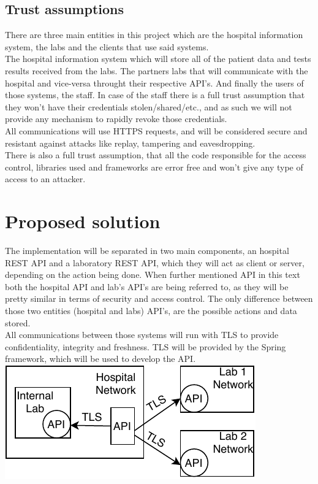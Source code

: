 \subsection{Trust assumptions}


There are three main entities in this project which are the hospital information system, the labs and the clients that use said systems. \\

The hospital information system which will store all of the patient data and tests results received from the labs. The partners labs that will communicate with the hospital and vice-versa throught their respective API's. And finally the users of those systems, the staff. In case of the staff there is a full trust assumption that they won't have their credentials stolen/shared/etc., and as such we will not provide any mechanism to rapidly revoke those credentials. \\

All communications will use HTTPS requests, and will be considered secure and resistant against attacks like replay, tampering and eavesdropping. \\

There is also a full trust assumption, that all the code responsible for the access control, libraries used and frameworks are error free and won't give any type of access to an attacker. \\


\section{Proposed solution}

The implementation will be separated in two main components, an hospital REST API and a laboratory REST API, which they will act as client or server, depending on the action being done. When further mentioned API in this text both the hospital API and lab's API's are being referred to, as they will be pretty similar in terms of security and access control. The only difference between those two entities (hospital and labs) API's, are the possible actions and data stored. \\

All communications between those systems will run with TLS to provide confidentiality, integrity and freshness. TLS will be provided by the Spring framework, which will be used to develop the API. \\

	\includegraphics[width=.4\textwidth]{figs/infrastructure.pdf}
	
